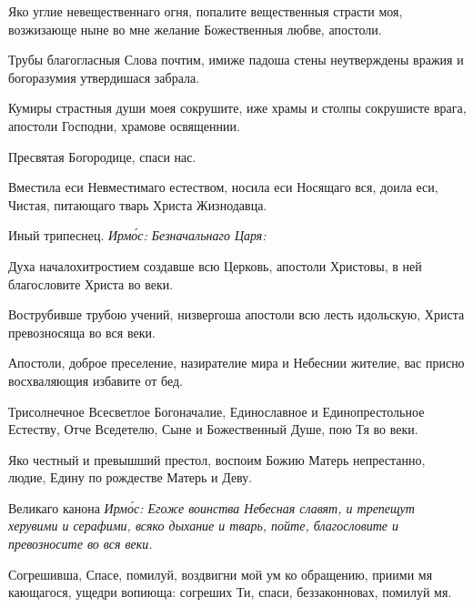 
Яко углие невещественнаго огня, попалите вещественныя страсти моя, возжизающе ныне во мне желание Божественныя любве, апостоли.


Трубы благогласныя Слова почтим, имиже падоша стены неутверждены вражия и богоразумия утвердишася забрала.


Кумиры страстныя души моея сокрушите, иже храмы и столпы сокрушисте врага, апостоли Господни, храмове освященнии.

Пресвятая Богородице, спаси нас.

Вместила еси Невместимаго естеством, носила еси Носящаго вся, доила еси, Чистая, питающаго тварь Христа Жизнодавца.

Иный трипеснец. \itshape Ирм\'{о}с\normalfont{}: Безначальнаго Царя:


Духа началохитростием создавше всю Церковь, апостоли Христовы, в ней благословите Христа во веки.


Вострубивше трубою учений, низвергоша апостоли всю лесть идольскую, Христа превозносяща во вся веки.


Апостоли, доброе преселение, назирателие мира и Небеснии жителие, вас присно восхваляющия избавите от бед.


Трисолнечное Всесветлое Богоначалие, Единославное и Единопрестольное Естеству, Отче Вседетелю, Сыне и Божественный Душе, пою Тя во веки.


Яко честный и превышший престол, воспоим Божию Матерь непрестанно, людие, Едину по рождестве Матерь и Деву.

Великаго канона \itshape Ирм\'{о}с\normalfont{}: Егоже воинства Небесная славят, и трепещут херувими и серафими, всяко дыхание и тварь, пойте, благословите и превозносите во вся веки.

Согрешивша, Спасе, помилуй, воздвигни мой ум ко обращению, приими мя кающагося, ущедри вопиюща: согреших Ти, спаси, беззаконновах, помилуй мя.

